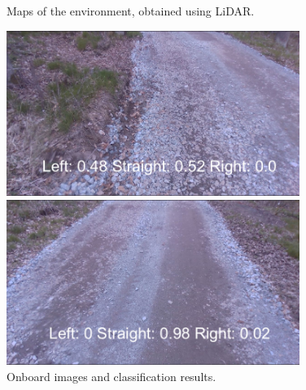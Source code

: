 \begin{figure}[!h]
  \centering	

  \caption{Maps of the environment, obtained using \acs{LiDAR}.}
  \label{fig:lidar}
\end{figure}
\begin{figure}[!h]
  \begin{minipage}{.5\linewidth}
  \centering
  \includegraphics[width=0.85\textwidth]{./fig/photos/path3_camera.png}
  
  \end{minipage}
  \begin{minipage}{.5\linewidth}
  \centering	
  \includegraphics[width=0.85\textwidth]{./fig/photos/path3_camera2.png}
  
  \end{minipage}
  \caption{Onboard images and classification results.}
  \label{fig:onboard}
\end{figure}





